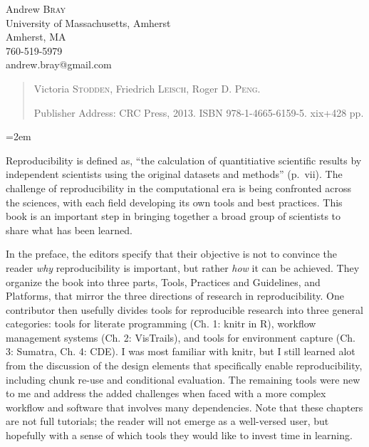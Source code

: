 \documentclass[12pt]{article}
\begin{document}
\noindent
Andrew \textsc{Bray}\\
University of Massachusetts, Amherst \\
Amherst, MA \\
760-519-5979 \\
andrew.bray@gmail.com\\
\medskip

\begin{quote}
Victoria \textsc{Stodden},
Friedrich \textsc{Leisch},
Roger D. \textsc{Peng}.

Publisher Address: CRC Press, 2013. ISBN 978-1-4665-6159-5. 
xix+428 pp. 
\end{quote}

\thispagestyle{empty}
\raggedright\baselineskip=18pt\parindent=2em\parskip=5pt

Reproducibility is defined as, ``the calculation of quantitiative scientific results by
independent scientists using the original datasets and methods'' (p.\ vii). The challenge
of reproducibility in the computational era is being confronted across the 
sciences, with each field developing its own tools and best practices.   This
book is an important step in bringing together a broad group of scientists to 
share what has been learned.

In the preface, the editors specify that their objective is not to convince the
reader \emph{why} reproducibility is important, but rather \emph{how} it can 
be achieved. They organize the book into three parts, Tools, Practices and 
Guidelines, and Platforms, that mirror the three directions of research in 
reproducibility. One contributor then usefully divides tools for reproducible research into three 
general categories: tools for literate programming (Ch. 1: knitr in R), workflow management 
systems (Ch. 2: VisTrails), and tools for environment capture (Ch. 3: Sumatra, Ch. 4: CDE). 
I was most familiar with knitr, but I still learned alot from the discussion
 of the design elements that specifically enable reproducibility, including chunk 
re-use and conditional evaluation. The remaining tools were new to me and address
the added challenges when faced with a more complex workflow and software that
involves many dependencies. Note that these chapters are not full
tutorials; the reader will not emerge as a well-versed user, but hopefully with a 
sense of which tools they would like to invest time in learning.
\end{document}
